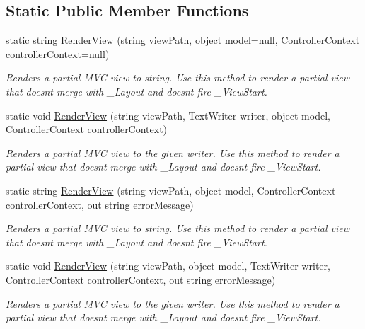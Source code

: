 \subsection*{Static Public Member Functions}
\begin{DoxyCompactItemize}
\item 
static string \hyperlink{class_open_1_1_g_i_1_1hypermart_1_1_helpers_1_1_view_renderer_a855fe4d3baa41ec21747aae42ab62c41}{Render\+View} (string view\+Path, object model=null, Controller\+Context controller\+Context=null)
\begin{DoxyCompactList}\small\item\em Renders a partial M\+VC view to string. Use this method to render a partial view that doesn\textquotesingle{}t merge with \+\_\+\+Layout and doesn\textquotesingle{}t fire \+\_\+\+View\+Start. \end{DoxyCompactList}\item 
static void \hyperlink{class_open_1_1_g_i_1_1hypermart_1_1_helpers_1_1_view_renderer_aad27a3171dfcb9a9d06351e637e249bf}{Render\+View} (string view\+Path, Text\+Writer writer, object model, Controller\+Context controller\+Context)
\begin{DoxyCompactList}\small\item\em Renders a partial M\+VC view to the given writer. Use this method to render a partial view that doesn\textquotesingle{}t merge with \+\_\+\+Layout and doesn\textquotesingle{}t fire \+\_\+\+View\+Start. \end{DoxyCompactList}\item 
static string \hyperlink{class_open_1_1_g_i_1_1hypermart_1_1_helpers_1_1_view_renderer_aba0a7e3bb189a5f1ce9ca4f8ace9c942}{Render\+View} (string view\+Path, object model, Controller\+Context controller\+Context, out string error\+Message)
\begin{DoxyCompactList}\small\item\em Renders a partial M\+VC view to string. Use this method to render a partial view that doesn\textquotesingle{}t merge with \+\_\+\+Layout and doesn\textquotesingle{}t fire \+\_\+\+View\+Start. \end{DoxyCompactList}\item 
static void \hyperlink{class_open_1_1_g_i_1_1hypermart_1_1_helpers_1_1_view_renderer_a54c412e138b0d84aba52d60003fe8f9f}{Render\+View} (string view\+Path, object model, Text\+Writer writer, Controller\+Context controller\+Context, out string error\+Message)
\begin{DoxyCompactList}\small\item\em Renders a partial M\+VC view to the given writer. Use this method to render a partial view that doesn\textquotesingle{}t merge with \+\_\+\+Layout and doesn\textquotesingle{}t fire \+\_\+\+View\+Start. \end{DoxyCompactList}\item 

\end{DoxyCompactItemize}
